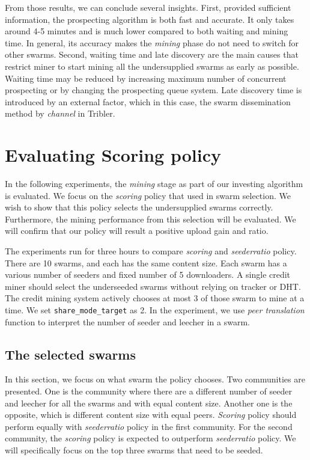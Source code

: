 From those results, we can conclude several insights. First, provided sufficient information, the prospecting algorithm is both fast and accurate. It only takes around 4-5 minutes and is much lower compared to both waiting and mining time. In general, its accuracy makes the \textit{mining} phase do not need to switch for other swarms. Second, waiting time and late discovery are the main causes that restrict miner to start mining all the undersupplied swarms as early as possible. Waiting time may be reduced by increasing maximum number of concurrent prospecting or by changing the prospecting queue system. Late discovery time is introduced by an external factor, which in this case, the swarm dissemination method by \textit{channel} in Tribler. 

\section{Evaluating Scoring policy}
\label{section:evalscoring}
In the following experiments, the \textit{mining} stage as part of our investing algorithm is evaluated. We focus on the \textit{scoring} policy that used in swarm selection. We wish to show that this policy selects the undersupplied swarms correctly. Furthermore, the mining performance from this selection will be evaluated. We will confirm that our policy will result a positive upload gain and ratio. 

The experiments run for three hours to compare \textit{scoring} and \textit{seederratio} policy. There are 10 swarms, and each has the same content size. Each swarm has a various number of seeders and fixed number of 5 downloaders. A single credit miner should select the underseeded swarms without relying on tracker or DHT. The credit mining system actively chooses at most 3 of those swarm to mine at a time. We set \texttt{share\_mode\_target} as 2. In the experiment, we use \textit{peer translation} function to interpret the number of seeder and leecher in a swarm. 

\subsection{The selected swarms}
In this section, we focus on what swarm the policy chooses. Two communities are presented. One is the community where there are a different number of seeder and leecher for all the swarms and with equal content size. Another one is the opposite, which is different content size with equal peers. \textit{Scoring} policy should perform equally with \textit{seederratio} policy in the first community. For the second community, the \textit{scoring} policy is expected to outperform \textit{seederratio} policy. We will specifically focus on the top three swarms that need to be seeded.

